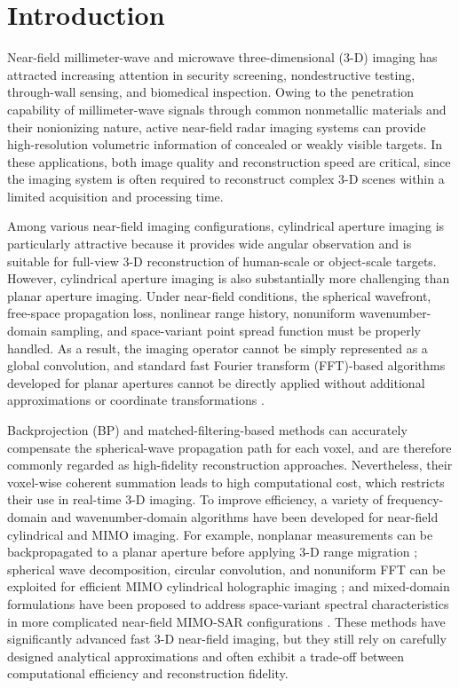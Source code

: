 \documentclass[journal]{IEEEtran}
\begin{document}
\section{Introduction}
Near-field millimeter-wave and microwave three-dimensional (3-D) imaging has attracted increasing attention in security screening, nondestructive testing, through-wall sensing, and biomedical inspection. Owing to the penetration capability of millimeter-wave signals through common nonmetallic materials and their nonionizing nature, active near-field radar imaging systems can provide high-resolution volumetric information of concealed or weakly visible targets. In these applications, both image quality and reconstruction speed are critical, since the imaging system is often required to reconstruct complex 3-D scenes within a limited acquisition and processing time.

Among various near-field imaging configurations, cylindrical aperture imaging is particularly attractive because it provides wide angular observation and is suitable for full-view 3-D reconstruction of human-scale or object-scale targets. However, cylindrical aperture imaging is also substantially more challenging than planar aperture imaging. Under near-field conditions, the spherical wavefront, free-space propagation loss, nonlinear range history, nonuniform wavenumber-domain sampling, and space-variant point spread function must be properly handled. As a result, the imaging operator cannot be simply represented as a global convolution, and standard fast Fourier transform (FFT)-based algorithms developed for planar apertures cannot be directly applied without additional approximations or coordinate transformations \cite{Fortuny-Guasch_Lopez-Sanchez_2001,Tan_Hong_Wang_Wu_2011,Gao_Deng_Qin_Wang_Li_2018,Wang_Yao_Song_Wang_Sun_2024}.

Backprojection (BP) and matched-filtering-based methods can accurately compensate the spherical-wave propagation path for each voxel, and are therefore commonly regarded as high-fidelity reconstruction approaches. Nevertheless, their voxel-wise coherent summation leads to high computational cost, which restricts their use in real-time 3-D imaging. To improve efficiency, a variety of frequency-domain and wavenumber-domain algorithms have been developed for near-field cylindrical and MIMO imaging. For example, nonplanar measurements can be backpropagated to a planar aperture before applying 3-D range migration \cite{Fortuny-Guasch_Lopez-Sanchez_2001}; spherical wave decomposition, circular convolution, and nonuniform FFT can be exploited for efficient MIMO cylindrical holographic imaging \cite{Gao_Deng_Qin_Wang_Li_2018}; and mixed-domain formulations have been proposed to address space-variant spectral characteristics in more complicated near-field MIMO-SAR configurations \cite{Wang_Yao_Song_Wang_Sun_2024}. These methods have significantly advanced fast 3-D near-field imaging, but they still rely on carefully designed analytical approximations and often exhibit a trade-off between computational efficiency and reconstruction fidelity.
\end{document}

